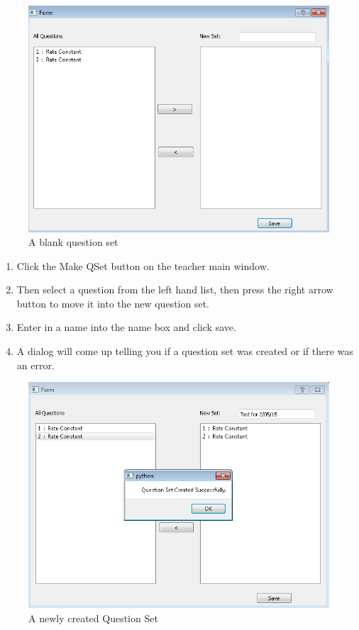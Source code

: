 \documentclass{report}
\begin{document}
\begin{figure}[h]
\centering
\centerline{\includegraphics{QSets1}}
\caption{A blank question set}
\label{fig:QSets1}
\end{figure}

\begin{enumerate}
\item Click the Make QSet button on the teacher main window.
\item Then select a question from the left hand list, then press the right arrow button to move it into the new question set.
\item Enter in a name into the name box and click save.
\item A dialog will come up telling you if a question set was created or if there was an error.
\end{enumerate}
\begin{figure}[h!]
\centering
\centerline{\includegraphics{QSets3}}
\caption{A newly created Question Set}
\label{fig:QSets2}
\end{figure}
\end{document}
